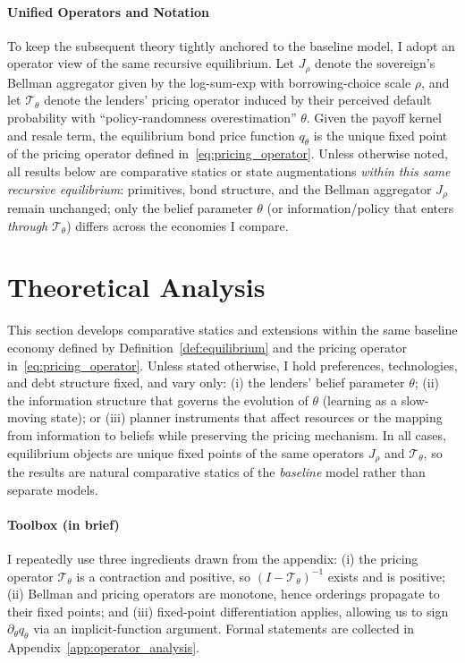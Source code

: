 \documentclass[12pt]{article}
\theoremstyle{plain}
\begin{document}
\paragraph{Unified Operators and Notation}
To keep the subsequent theory tightly anchored to the baseline model, I adopt
an operator view of the same recursive equilibrium. Let $J_\rho$ denote the
sovereign's Bellman aggregator given by the log-sum-exp with
borrowing-choice scale $\rho$, and let $\mathcal T_\theta$ denote the lenders'
pricing operator induced by their perceived default probability with
``policy-randomness overestimation'' $\theta$. Given the payoff kernel and
resale term, the equilibrium bond price function $q_\theta$ is the unique fixed
point of the pricing operator defined in~\eqref{eq:pricing_operator}. Unless
otherwise noted, all results below are comparative statics or state
augmentations \emph{within this same recursive equilibrium}: primitives, bond
structure, and the Bellman aggregator $J_\rho$ remain unchanged; only the
belief parameter $\theta$ (or information/policy that enters \emph{through}
$\mathcal T_\theta$) differs across the economies I compare.

\section{Theoretical Analysis}
\label{sec:theory}

This section develops comparative statics and extensions within the same
baseline economy defined by Definition~\ref{def:equilibrium} and the pricing
operator in~\eqref{eq:pricing_operator}. Unless stated otherwise, I hold
preferences, technologies, and debt structure fixed, and vary only: (i) the
lenders' belief parameter $\theta$; (ii) the information structure that governs
the evolution of $\theta$ (learning as a slow-moving state); or (iii) planner
instruments that affect resources or the mapping from information to beliefs
while preserving the pricing mechanism. In all cases, equilibrium objects are
unique fixed points of the same operators $J_\rho$ and $\mathcal T_\theta$, so
the results are natural comparative statics of the \emph{baseline} model rather
than separate models.

\paragraph{Toolbox (in brief)}
I repeatedly use three ingredients drawn from the appendix: (i) the pricing
operator $\mathcal T_\theta$ is a contraction and positive, so $(I-\mathcal
	T_\theta)^{-1}$ exists and is positive; (ii) Bellman and pricing operators are
monotone, hence orderings propagate to their fixed points; and (iii)
fixed-point differentiation applies, allowing us to sign $\partial_\theta
	q_\theta$ via an implicit-function argument. Formal statements are collected in
Appendix~\ref{app:operator_analysis}.
\end{document}
